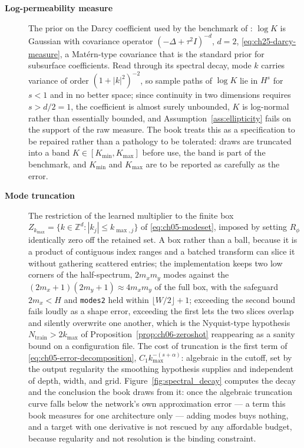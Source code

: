 \begin{description}
\item[\textbf{Log-permeability measure}] The prior on the Darcy coefficient used by the
benchmark of : $\log K$ is
Gaussian with covariance operator $(-\Delta + \tau^{2} I)^{-d}$, $d = 2$,
\eqref{eq:ch25-darcy-measure}, a Mat\'ern-type covariance that is the standard prior for
subsurface coefficients. Read through its spectral decay, mode $k$ carries variance of
order $(1 + |k|^{2})^{-2}$, so sample paths of $\log K$ lie in $H^{s}$ for $s < 1$ and in
no better space; since continuity in two dimensions requires $s > d/2 = 1$, the
coefficient is almost surely unbounded, $K$ is log-normal rather than essentially
bounded, and Assumption~\ref{ass:ellipticity} fails on the support of the raw measure.
The book treats this as a specification to be repaired rather than a pathology to be
tolerated: draws are truncated into a band $K \in [K_{\min}, K_{\max}]$ before use, the
band is part of the benchmark, and $K_{\min}$ and $K_{\max}$ are to be reported as
carefully as the error. 

\item[\textbf{Mode truncation}] The restriction of the learned multiplier to the finite
box $Z_{k_{\max}} = \{k \in \mathbb{Z}^{d} : |k_{j}| \le k_{\max, j}\}$ of
\eqref{eq:ch05-modeset}, imposed by setting $R_{\phi}$ identically zero off the retained
set. A box rather than a ball, because it is a product of contiguous index ranges and a
batched transform can slice it without gathering scattered entries; the implementation
keeps two low corners of the half-spectrum, $2 m_{x} m_{y}$ modes against the
$(2m_{x}+1)(2m_{y}+1) \approx 4 m_{x} m_{y}$ of the full box, with the safeguard
$2 m_{x} < H$ and \texttt{modes2} held within $\lfloor W/2 \rfloor + 1$; exceeding the
second bound fails loudly as a shape error, exceeding the first lets the two slices
overlap and silently overwrite one another, which is the Nyquist-type hypothesis
$N_{\text{train}} > 2 k_{\max}$ of Proposition~\ref{prop:ch06-zeroshot} reappearing as a
sanity bound on a configuration file. The cost of truncation is the first term of
\eqref{eq:ch05-error-decomposition}, $C_{1} k_{\max}^{-(s+\alpha)}$: algebraic in the cutoff,
set by the output regularity the smoothing hypothesis supplies and independent of depth, width, and grid.
Figure~\ref{fig:spectral_decay} computes the decay and the conclusion the book draws from
it: once the algebraic truncation curve falls below the network's own approximation
error --- a term this book measures for one architecture only --- adding modes buys
nothing, and a target with one derivative is not
rescued by any affordable budget, because regularity and not resolution is the binding
constraint. 


\end{description}
